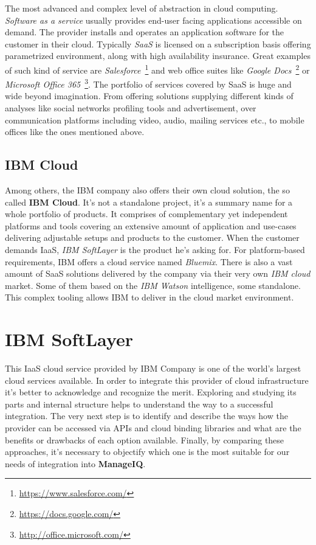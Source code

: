 The most advanced and complex level of abstraction in cloud computing. \emph{Software as a service} usually provides end-user facing applications accessible on demand. The provider installs and operates an application software for the customer in their cloud. Typically \emph{SaaS} is licensed on a subscription basis offering parametrized environment, along with high availability insurance. Great examples of such kind of service are \emph{Salesforce}~\footnote{\url{https://www.salesforce.com/}} and web office suites like \emph{Google Docs}~\footnote{\url{https://docs.google.com/}} or \emph{Microsoft Office 365}~\footnote{\url{http://office.microsoft.com/}}. The portfolio of services covered by SaaS is huge and wide beyond imagination. From offering solutions supplying different kinds of analyses like social networks profiling tools and advertisement, over communication platforms including video, audio, mailing services etc., to mobile offices like the ones mentioned above.

\section{IBM Cloud}
\label{sec:IBM Cloud}

Among others, the IBM company also offers their own cloud solution, the so called \textbf{IBM Cloud}. It's not a standalone project, it's a summary name for a whole portfolio of products. It comprises of complementary yet independent platforms and tools covering an extensive amount of application and use-cases delivering adjustable setups and products to the customer. When the customer demands IaaS, \emph{IBM SoftLayer} is the product he's asking for. For platform-based requirements, IBM offers a cloud service named \emph{Bluemix}. There is also a vast amount of SaaS solutions delivered by the company via their very own \emph{IBM cloud} market. Some of them based on the \emph{IBM Watson} intelligence, some standalone. This complex tooling allows IBM to deliver in the cloud market environment.

\chapter{IBM SoftLayer}
\label{chap:IBM SoftLayer}

This IaaS cloud service provided by IBM Company is one of the world's largest cloud services available. In order to integrate this provider of cloud infrastructure it's better to acknowledge and recognize the merit. Exploring and studying its parts and internal structure helps to understand the way to a successful integration. The very next step is to identify and describe the ways how the provider can be accessed via APIs and cloud binding libraries and what are the benefits or drawbacks of each option available. Finally, by comparing these approaches, it's necessary to objectify which one is the most suitable for our needs of integration into \textbf{ManageIQ}.

